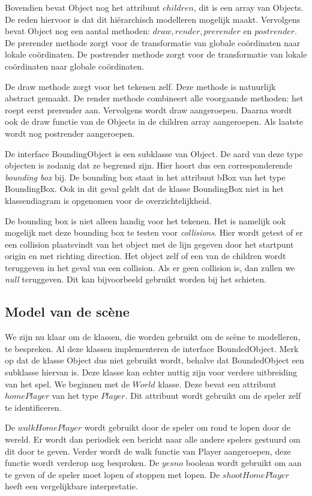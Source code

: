 \documentclass[a4paper,11pt]{article}
\begin{document}
Bovendien bevat Object nog het attribuut $children$, dit is een array van Objects. De reden hiervoor is dat dit hi\"erarchisch modelleren mogelijk maakt. Vervolgens bevat Object nog een aantal methoden: $draw, render, prerender$ en $postrender$. De prerender methode zorgt voor de transformatie van globale co\"ordinaten naar lokale co\"ordinaten. De postrender methode zorgt voor de transformatie van lokale co\"ordinaten naar globale co\"ordinaten.

De draw methode zorgt voor het tekenen zelf. Deze methode is natuurlijk abstract gemaakt. De render methode combineert alle voorgaande methoden: het roept eerst prerender aan. Vervolgens wordt draw aangeroepen. Daarna wordt ook de draw functie van de Objects in de children array aangeroepen. Als laatste wordt nog postrender aangeroepen.

De interface BoundingObject is een subklasse van Object. De aard van deze type objecten is zodanig dat ze begrensd zijn. Hier hoort dus een corresponderende \emph{bounding box} bij. De bounding box staat in het attribuut bBox van het type BoundingBox. Ook in dit geval geldt dat de klasse BoundingBox niet in het klassendiagram is opgenomen voor de overzichtelijkheid.

De bounding box is niet alleen handig voor het tekenen. Het is namelijk ook mogelijk met deze bounding box te testen voor \emph{collisions}. Hier wordt getest of er een collision plaatsvindt van het object met de lijn gegeven door het startpunt origin en met richting direction. Het object zelf of een van de children wordt teruggeven in het geval van een collision. Als er geen collision is, dan zullen we \emph{null} teruggeven. Dit kan bijvoorbeeld gebruikt worden bij het schieten.

\subsection{Model van de sc\`ene}
    \label{sec:model}
We zijn nu klaar om de klassen, die worden gebruikt om de sc\`ene te modelleren, te bespreken.  Al deze klassen implementeren de interface BoundedObject. Merk op dat de klasse Object dus niet gebruikt wordt, behalve dat BoundedObject een subklasse hiervan is. Deze klasse kan echter nuttig zijn voor verdere uitbreiding van het spel. We beginnen met de $World$ klasse. Deze bevat een attribuut $homePlayer$ van het type $Player$. Dit attribuut wordt gebruikt om de speler zelf te identificeren.

De $walkHomePlayer$ wordt gebruikt door de speler om rond te lopen door de wereld. Er wordt dan periodiek een bericht naar alle andere spelers gestuurd om dit door te geven. Verder wordt de walk functie van Player aangeroepen, deze functie wordt verderop nog besproken. De $yesno$ boolean wordt gebruikt om aan te geven of de speler moet lopen of stoppen met lopen. De $shootHomePlayer$ heeft een vergelijkbare interpretatie.
\end{document}
